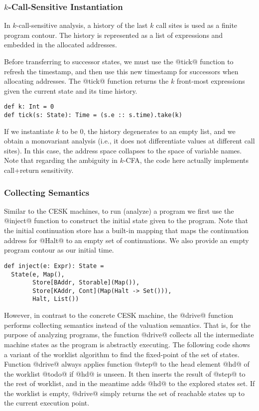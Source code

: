 \documentclass[acmsmall]{acmart}\settopmatter{}
\begin{document}
\subsubsection{$k$-Call-Sensitive Instantiation} \label{kcfainst}

In $k$-call-sensitive analysis, a history of the last $k$ call sites is
used as a finite program contour.
The history is represented as a list of expressions and embedded
in the allocated addresses.

Before transferring to successor states, we must use the @tick@ function to
refresh the timestamp, and then use this new timestamp for successors when allocating addresses.
The @tick@ function returns the $k$ front-most expressions given the current state and its
time history.

\begin{lstlisting}
def k: Int = 0
def tick(s: State): Time = (s.e :: s.time).take(k)
\end{lstlisting}

If we instantiate $k$ to be $0$, the history degenerates to an empty list,
and we obtain a monovariant analysis (i.e., it does
not differentiate values at different call sites). In this case, the address
space collapses to the space of variable names.
Note that regarding the ambiguity in $k$-CFA\cite{Gilray:2016:ACP:2951913.2951936},
the code here actually implements call+return sensitivity.

\subsubsection{Collecting Semantics}

Similar to the CESK machines, to run (analyze) a program
we first use the @inject@ function to construct the initial state given to the program.
Note that the initial continuation store has a built-in mapping that maps the continuation
address for @Halt@ to an empty set of continuations.
We also provide an empty program contour as our initial time.
\begin{lstlisting}
def inject(e: Expr): State =
  State(e, Map(),
        Store[BAddr, Storable](Map()),
        Store[KAddr, Cont](Map(Halt -> Set())),
        Halt, List())
\end{lstlisting}

However, in contrast to the concrete CESK machine, the
@drive@ function performs collecting semantics instead of the valuation
semantics. That is, for the purpose of analyzing programs, the function @drive@
collects all the intermediate machine states as the program is abstractly executing.
The following code shows a variant of the worklist algorithm to find the fixed-point
of the set of states.
Function @drive@ always applies function @step@ to the head element @hd@ of
the worklist @todo@ if @hd@ is unseen. It then inserts the result of @step@ to
the rest of worklist, and in the meantime adds @hd@ to the explored states set.
If the worklist is empty, @drive@ simply returns the set of reachable states
up to the current execution point.
\end{document}
